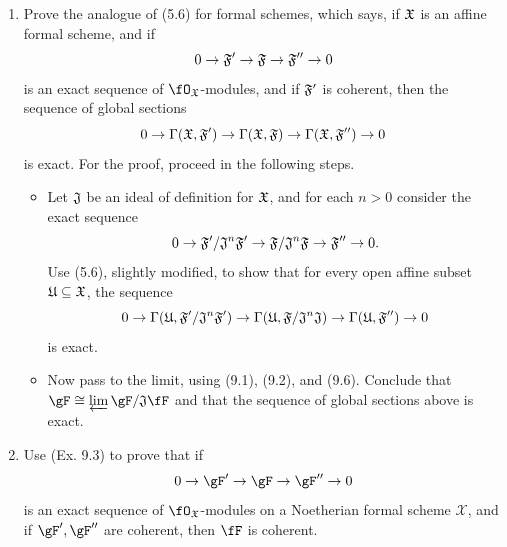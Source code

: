 \documentclass[a4paper]{article}
\begin{document}
\begin{enumerate} [label=\textbf{\arabic*.}, leftmargin=0em]
    \item Prove the analogue of (5.6) for formal schemes, which says, if $\mathfrak{X}$ is an affine formal scheme, and if
          \begin{equation*}
              0 \to \mathfrak{F}' \to \mathfrak{F} \to \mathfrak{F}'' \to 0
          \end{equation*}
          is an exact sequence of $\fO_\goth{X}$-modules, and if $\mathfrak{F}'$ is coherent, then the sequence of global sections
          \begin{equation*}
              0 \to \Gamma(\mathfrak{X}, \mathfrak{F}') \to \Gamma(\mathfrak{X}, \mathfrak{F}) \to \Gamma(\mathfrak{X}, \mathfrak{F}'') \to 0
          \end{equation*}
          is exact. For the proof, proceed in the following steps.
          \begin{itemize}
              \item[(a)] Let $\mathfrak{J}$ be an ideal of definition for $\mathfrak{X}$, and for each $n > 0$ consider the exact sequence
                    \begin{equation*}
                        0 \to \mathfrak{F}'/\mathfrak{J}^n \mathfrak{F}' \to \mathfrak{F} / \mathfrak{J}^n \mathfrak{F} \to \mathfrak{F}'' \to 0.
                    \end{equation*}
                    Use (5.6), slightly modified, to show that for every open affine subset $\mathfrak{U} \subseteq \mathfrak{X}$, the sequence
                    \begin{equation*}
                        0 \to \Gamma(\mathfrak{U}, \mathfrak{F}'/\mathfrak{J}^n \mathfrak{F}') \to \Gamma(\mathfrak{U}, \mathfrak{F}/\mathfrak{J}^n \mathfrak{J}) \to \Gamma(\mathfrak{U}, \mathfrak{F}'') \to 0
                    \end{equation*}
                    is exact.
              \item[(b)] Now pass to the limit, using (9.1), (9.2), and (9.6). Conclude that $\gF \cong \varprojlim \gF / \goth{J} \fF$ and that the sequence of global sections above is exact.
          \end{itemize}

    \item Use (Ex. 9.3) to prove that if
          \begin{equation*}
              0 \to \gF' \to \gF \to \gF'' \to 0
          \end{equation*}
          is an exact sequence of $\fO_\goth{X}$-modules on a Noetherian formal scheme $\mathscr{X}$, and if $\gF', \gF''$ are coherent, then $\fF$ is coherent.


\end{enumerate}
\end{document}
